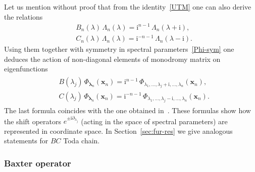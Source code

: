 \documentclass[11pt]{article}
\numberwithin{equation}{section}
\theoremstyle{plain}
\theoremstyle{definition}
\renewcommand{\imath}{\mathrm{i}}
\begin{document}
Let us mention without proof that from the identity~\eqref{UTM} one can also derive the relations
\begin{align}
	& B_n(\lambda) \, \Lambda_n(\lambda) = \imath^{n - 1} \, \Lambda_n(\lambda + \imath), \\[6pt] \label{CL}
	& C_n(\lambda) \, \Lambda_n(\lambda) = \imath^{-n - 1} \, \Lambda_n(\lambda - \imath).
\end{align}
Using them together with symmetry in spectral parameters~\eqref{Phi-sym} one deduces the action of non-diagonal elements of monodromy matrix on eigenfunctions 
\begin{align} \label{BC-Phi}
	\begin{aligned}
		& B(\lambda_j) \, \Phi_{\bm{\lambda}_n}(\bm{x}_n) = \imath^{n - 1} \, \Phi_{\lambda_1, \dots, \lambda_j + \imath, \dots, \lambda_n}(\bm{x}_n), \\[6pt]
		& C(\lambda_j) \, \Phi_{\bm{\lambda}_n}(\bm{x}_n) = \imath^{-n - 1}  \, \Phi_{\lambda_1, \dots, \lambda_j - \imath, \dots, \lambda_n}(\bm{x}_n).
	\end{aligned}
\end{align}
The last formula coincides with the one obtained in~\cite[(3.1b)]{KL}. These formulas show how the shift operators $e^{\pm \imath \partial_{\lambda_j}}$ (acting in the space of spectral parameters) are represented in coordinate space. In Section~\ref{sec:fur-res} we give analogous statements for $BC$ Toda chain.

\subsubsection{Baxter operator} \label{sec:int-baxt}
\end{document}
